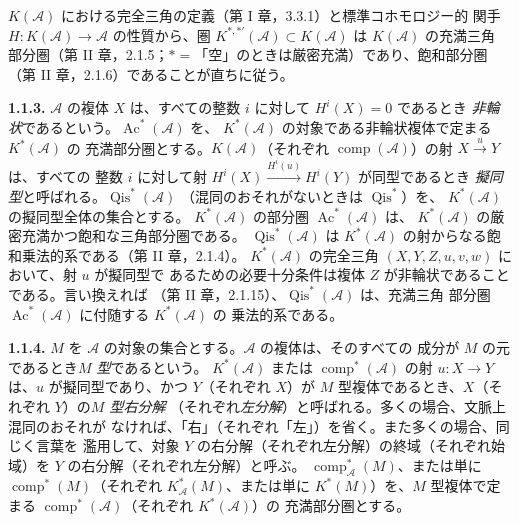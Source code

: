 \clearpage
{}%
\begingroup\small\setlength{\parskip}{0pt}\setlength{\emergencystretch}{1.5em}
\setlength{\abovedisplayskip}{4pt plus 2pt minus 2pt}%
\setlength{\belowdisplayskip}{4pt plus 2pt minus 2pt}%

$K(\mathcal A)$ における完全三角の定義（第 I 章，3.3.1）と標準コホモロジー的
関手 $H\colon K(\mathcal A)\longrightarrow\mathcal A$ の性質から、圏
$K^{*,*'}(\mathcal A)\subset K(\mathcal A)$ は $K(\mathcal A)$ の充満三角
部分圏（第 II 章，2.1.5；$*={}$「空」のときは厳密充満）であり、飽和部分圏
（第 II 章，2.1.6）であることが直ちに従う。

\medskip\noindent\textbf{1.1.3.}\quad
$\mathcal A$ の複体 $X$ は、すべての整数 $i$ に対して $H^i(X)=0$ であるとき
\emph{非輪状}であるという。$\operatorname{Ac}^{*}(\mathcal A)$ を、
$K^{*}(\mathcal A)$ の対象である非輪状複体で定まる $K^{*}(\mathcal A)$ の
充満部分圏とする。$K(\mathcal A)$（それぞれ
$\operatorname{comp}(\mathcal A)$）の射 $X\xrightarrow{u}Y$ は、すべての
整数 $i$ に対して射 $H^i(X)\xrightarrow{H^i(u)}H^i(Y)$ が同型であるとき
\emph{擬同型}と呼ばれる。$\operatorname{Qis}^{*}(\mathcal A)$
（混同のおそれがないときは $\operatorname{Qis}^{*}$）を、
$K^{*}(\mathcal A)$ の擬同型全体の集合とする。
$K^{*}(\mathcal A)$ の部分圏 $\operatorname{Ac}^{*}(\mathcal A)$ は、
$K^{*}(\mathcal A)$ の厳密充満かつ飽和な三角部分圏である。
$\operatorname{Qis}^{*}(\mathcal A)$
は $K^{*}(\mathcal A)$ の射からなる飽和乗法的系である（第 II 章，2.1.4）。
$K^{*}(\mathcal A)$ の完全三角 $(X,Y,Z,u,v,w)$ において、射 $u$ が擬同型で
あるための必要十分条件は複体 $Z$ が非輪状であることである。言い換えれば
（第 II 章，2.1.15）、$\operatorname{Qis}^{*}(\mathcal A)$ は、充満三角
部分圏 $\operatorname{Ac}^{*}(\mathcal A)$ に付随する $K^{*}(\mathcal A)$ の
乗法的系である。

\medskip\noindent\textbf{1.1.4.}\quad
$M$ を $\mathcal A$ の対象の集合とする。$\mathcal A$ の複体は、そのすべての
成分が $M$ の元であるとき\emph{$M$ 型}であるという。
$K^{*}(\mathcal A)$ または $\operatorname{comp}^{*}(\mathcal A)$ の射
$u\colon X\longrightarrow Y$ は、$u$ が擬同型であり、かつ $Y$（それぞれ
$X$）が $M$ 型複体であるとき、$X$（それぞれ $Y$）の\emph{$M$ 型右分解}
（それぞれ\emph{左分解}）と呼ばれる。多くの場合、文脈上混同のおそれが
なければ、「右」（それぞれ「左」）を省く。また多くの場合、同じく言葉を
濫用して、対象 $Y$ の右分解（それぞれ左分解）の終域（それぞれ始域）を
$Y$ の右分解（それぞれ左分解）と呼ぶ。
$\operatorname{comp}_{\mathcal A}^{*}(M)$、または単に
$\operatorname{comp}^{*}(M)$（それぞれ $K_{\mathcal A}^{*}(M)$、または単に
$K^{*}(M)$）を、$M$ 型複体で定まる
$\operatorname{comp}^{*}(\mathcal A)$（それぞれ $K^{*}(\mathcal A)$）の
充満部分圏とする。

